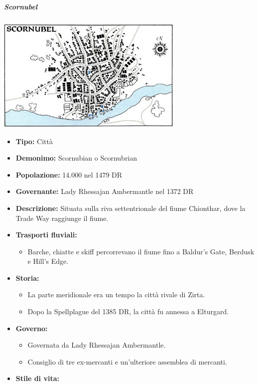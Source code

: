 \documentclass{article}
\begin{document}
\subparagraph{Scornubel}
\includegraphics[height=7 cm, width= 9cm]{../Mappe/Scornubel.PNG.jpg}
\begin{itemize}
    \item \textbf{Tipo:} Città
    \item \textbf{Demonimo:} Scornubian o Scornubrian
    \item \textbf{Popolazione:} 14.000 nel 1479 DR
    \item \textbf{Governante:} Lady Rhessajan Ambermantle nel 1372 DR
    \item \textbf{Descrizione:} Situata sulla riva settentrionale del fiume Chionthar, dove la Trade Way raggiunge il fiume.
    \item \textbf{Trasporti fluviali:} 
    \begin{itemize}
        \item Barche, chiatte e skiff percorrevano il fiume fino a Baldur's Gate, Berdusk e Hill's Edge.
    \end{itemize}
    \item \textbf{Storia:} 
    \begin{itemize}
        \item La parte meridionale era un tempo la città rivale di Zirta.
        \item Dopo la Spellplague del 1385 DR, la città fu annessa a Elturgard.
    \end{itemize}
    \item \textbf{Governo:} 
    \begin{itemize}
        \item Governata da Lady Rhessajan Ambermantle.
        \item Consiglio di tre ex-mercanti e un'ulteriore assemblea di mercanti.
    \end{itemize}
    \item \textbf{Stile di vita:} 
    \begin{itemize}

\end{itemize}
\end{itemize}
\end{document}
